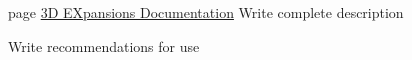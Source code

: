 \label{todo__todo000001}
\hypertarget{todo__todo000001}{}
 
\begin{DoxyDescription}
\item[page \hyperlink{index}{3D EXpansions Documentation} ]Write complete description

Write recommendations for use
\end{DoxyDescription}